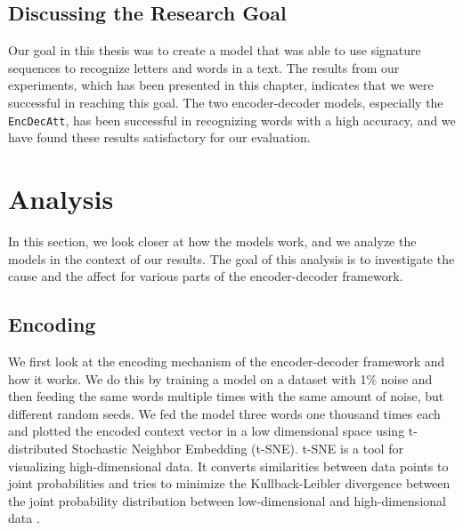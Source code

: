 \subsection{Discussing the Research Goal}
Our goal in this thesis was to create a model that was able to use signature sequences to recognize letters and words in a text. The results from our experiments, which has been presented in this chapter, indicates that we were successful in reaching this goal. The two encoder-decoder models, especially the {\tt EncDecAtt}, has been successful in recognizing words with a high accuracy, and we have found these results satisfactory for our evaluation.


\section{Analysis}
\label{sec:reasoning}
In this section, we look closer at how the models work, and we analyze the models in the context of our results. The goal of this analysis is to investigate the cause and the affect for various parts of the encoder-decoder framework.

\subsection{Encoding}
We first look at the encoding mechanism of the encoder-decoder framework and how it works. We do this by training a model on a dataset with 1\% noise and then feeding the same words multiple times with the same amount of noise, but different random seeds. We fed the model three words one thousand times each and plotted the encoded context vector in a low dimensional space using t-distributed Stochastic Neighbor Embedding (t-SNE). t-SNE is a tool for visualizing high-dimensional data. It converts similarities between data points to joint probabilities and tries to minimize the Kullback-Leibler divergence between the joint probability distribution between low-dimensional and high-dimensional data \citep{maaten2008visualizing}.

